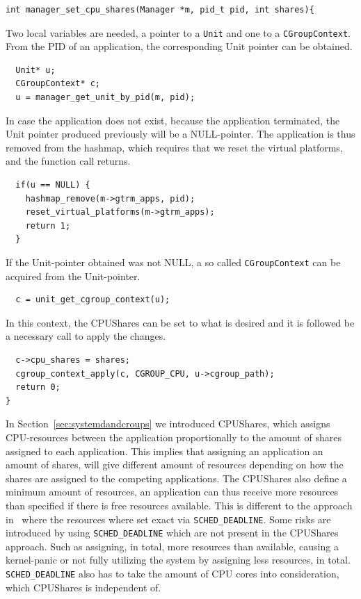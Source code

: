 \documentclass[nobiblatex]{LTHthesis}
\begin{document}
\begin{lstlisting}
int manager_set_cpu_shares(Manager *m, pid_t pid, int shares){
\end{lstlisting}
Two local variables are needed, a pointer to a \texttt{Unit} and one to a 
\texttt{CGroupContext}. From the PID of an application, the corresponding 
Unit pointer can be obtained.
\begin{lstlisting}
  Unit* u;
  CGroupContext* c;
  u = manager_get_unit_by_pid(m, pid);
\end{lstlisting}
In case the application does not exist, because the application terminated,
the Unit pointer produced previously will be a NULL-pointer. The application
is thus removed from the hashmap, which requires that we reset the virtual
platforms, and the function call returns.
\begin{lstlisting}
  if(u == NULL) {
    hashmap_remove(m->gtrm_apps, pid);
    reset_virtual_platforms(m->gtrm_apps);
    return 1;
  }
\end{lstlisting}

If the Unit-pointer obtained was not NULL, a so called \texttt{CGroupContext}
can be acquired from the Unit-pointer.
\begin{lstlisting}
  c = unit_get_cgroup_context(u);
\end{lstlisting}
In this context, the CPUShares can be set to what is desired and it is
followed be a necessary call to apply the changes.
\begin{lstlisting}
  c->cpu_shares = shares;
  cgroup_context_apply(c, CGROUP_CPU, u->cgroup_path);
  return 0;
}
\end{lstlisting}

In Section~\ref{sec:systemdandcroups} we introduced CPUShares, which assigns CPU-resources between the application proportionally to the amount of shares assigned to each application. This implies that assigning an application an amount of shares, will give different amount of resources depending on how the shares are assigned to the competing applications. The CPUShares also define a minimum amount of resources, an application can thus receive more resources than specified if there is free resources available. This is different to the approach in~\cite{gtrm} where the resources where set exact via \texttt{SCHED\_DEADLINE}. Some risks are introduced by using \texttt{SCHED\_DEADLINE} which are not present in the CPUShares approach. Such as assigning, in total, more resources than available, causing a kernel-panic or not fully utilizing the system by assigning less resources, in total. \texttt{SCHED\_DEADLINE} also has to take the amount of CPU cores into consideration, which CPUShares is independent of.
\end{document}

